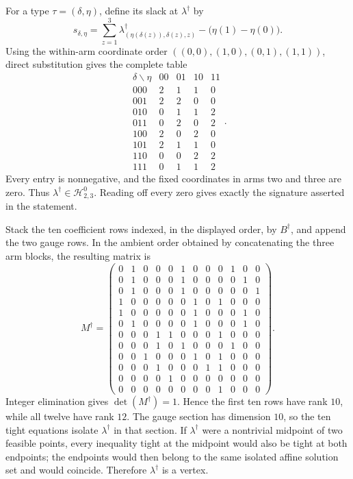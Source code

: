 For a type \(\tau=(\delta,\eta)\), define its slack at \(\lambda^\dagger\) by
\[s_{\delta,\eta}=\sum_{z=1}^{3}\lambda^\dagger_{(\eta(\delta(z)),\delta(z),z)}-\bigl(\eta(1)-\eta(0)\bigr).\]
Using the within-arm coordinate order \(((0,0),(1,0),(0,1),(1,1))\), direct substitution gives the complete table
\[\begin{array}{c|rrrr}\delta\backslash\eta&00&01&10&11\\ \hline 000&2&1&1&0\\001&2&2&0&0\\010&0&1&1&2\\011&0&2&0&2\\100&2&0&2&0\\101&2&1&1&0\\110&0&0&2&2\\111&0&1&1&2\end{array}.\]
Every entry is nonnegative, and the fixed coordinates in arms two and three are zero. Thus \(\lambda^\dagger\in\mathcal H^0_{2,3}\). Reading off every zero gives exactly the signature asserted in the statement.

Stack the ten coefficient rows indexed, in the displayed order, by \(B^\dagger\), and append the two gauge rows. In the ambient order obtained by concatenating the three arm blocks, the resulting matrix is
\[M^\dagger=\left(\begin{array}{rrrrrrrrrrrr}0&1&0&0&0&1&0&0&0&1&0&0\\0&1&0&0&0&1&0&0&0&0&1&0\\0&1&0&0&0&1&0&0&0&0&0&1\\1&0&0&0&0&0&1&0&1&0&0&0\\1&0&0&0&0&0&1&0&0&0&1&0\\0&1&0&0&0&0&1&0&0&0&1&0\\0&0&0&1&1&0&0&0&1&0&0&0\\0&0&0&1&0&1&0&0&0&1&0&0\\0&0&1&0&0&0&1&0&1&0&0&0\\0&0&0&1&0&0&0&1&1&0&0&0\\0&0&0&0&1&0&0&0&0&0&0&0\\0&0&0&0&0&0&0&0&1&0&0&0\end{array}\right).\]
Integer elimination gives \(\det(M^\dagger)=1\). Hence the first ten rows have rank \(10\), while all twelve have rank \(12\). The gauge section has dimension \(10\), so the ten tight equations isolate \(\lambda^\dagger\) in that section. If \(\lambda^\dagger\) were a nontrivial midpoint of two feasible points, every inequality tight at the midpoint would also be tight at both endpoints; the endpoints would then belong to the same isolated affine solution set and would coincide. Therefore \(\lambda^\dagger\) is a vertex.

